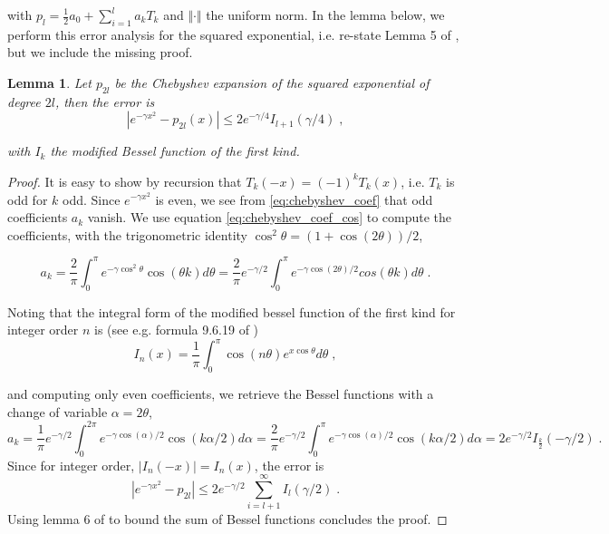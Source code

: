 \documentclass{article}
\newtheorem{lemma}[theorem]{Lemma}
\begin{document}
with $p_l = \frac 1 2 a_0 +  \sum_{i=1}^l a_k T_k$ and $\Vert \cdot \Vert$ the uniform norm. In the lemma below, we perform this error analysis for the squared exponential, i.e. re-state Lemma 5 of \cite{gardner_gpytorch_2021}, but we include the missing proof. 

\begin{lemma}
Let $p_{2l}$ be the Chebyshev expansion of the squared exponential of degree $2l$, then the error is
\begin{equation*}
    | e^{-\gamma x^2} - p_{2l}(x)| \le 2 e^{-\gamma / 4} I_{l+1}(\gamma / 4) \; ,
\end{equation*}

with $I_k$ the modified Bessel function of the first kind.
\end{lemma}
\begin{proof}
It is easy to show by recursion that $T_k(-x) = (-1)^k T_k(x)$, i.e. $T_k$ is odd for $k$ odd. Since $e^{-\gamma x^2}$ is even, we see from \eqref{eq:chebyshev_coef} that odd coefficients $a_k$ vanish. We use equation \eqref{eq:chebyshev_coef_cos} to compute the coefficients, with the trigonometric identity $\cos^2\theta = (1 + \cos(2\theta))/2$,

\begin{equation*}
    a_k = \frac{2}{\pi} \int_0^\pi e^{-\gamma \cos^2 \theta} \cos(\theta k) d\theta = \frac{2}{\pi} e^{-\gamma / 2} \int_0^\pi e^{-\gamma \cos(2\theta) / 2} cos(\theta k) d\theta \; .
\end{equation*}

Noting that the integral form of the modified bessel function of the first kind for integer order $n$ is (see e.g. formula 9.6.19 of \cite{abramowitz_handbook_1972})
\begin{equation*}
    I_n(x) = \frac{1}{\pi} \int_0^\pi \cos(n\theta) e^{x\cos\theta} d\theta \; ,
\end{equation*}

and computing only even coefficients, we retrieve the Bessel functions with a change of variable $\alpha=2\theta$,
\begin{equation*}
    a_k = \frac{1}{\pi} e^{-\gamma /2} \int_0^{2\pi} e^{-\gamma \cos( \alpha)/2} \cos(k\alpha / 2) d\alpha 
    = \frac{2}{\pi} e^{-\gamma /2} \int_0^{\pi} e^{-\gamma \cos( \alpha)/2} \cos(k\alpha / 2) d\alpha = 2 e^{-\gamma/2} I_{\frac{k}{2}}(-\gamma/2) \; .
\end{equation*}
Since for integer order, $|I_n(-x)| = I_n(x)$, the error is 
\begin{equation*}
    |e^{-\gamma x^2 } - p_{2l} |\le 2 e^{-\gamma/2} \sum_{i=l+1}^\infty I_{l}(\gamma / 2) \; .
\end{equation*}
Using lemma 6 of \cite{gardner_gpytorch_2021} to bound the sum of Bessel functions concludes the proof. 
\end{proof}
\end{document}

